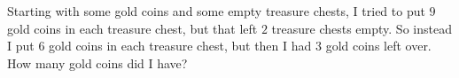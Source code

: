 Starting with some gold coins and some empty treasure chests, I tried to put $9$ gold coins in each treasure chest, but that left $2$ treasure chests empty. So instead I put $6$ gold coins in each treasure chest, but then I had $3$ gold coins left over. How many gold coins did I have?
